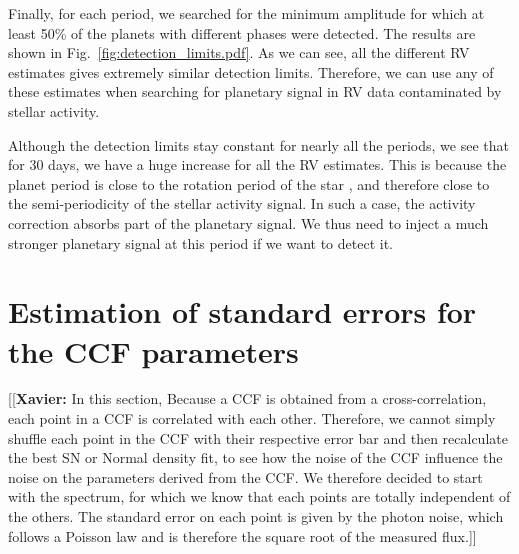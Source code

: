 \documentclass{aa}
\newcommand{\xavier}[1]{{\color{blue}[[\textbf{Xavier: }#1]]}}
\begin{document}
{Finally, for each period, we searched for the minimum amplitude for which at least 50\% of the planets with different phases were detected. The results are shown in Fig.~\ref{fig:detection_limits.pdf}. As we can see, all the different RV estimates gives extremely similar detection limits. Therefore, we can use any of these estimates when searching for planetary signal in RV data contaminated by stellar activity.

Although the detection limits stay constant for nearly all the periods, we see that for 30 days, we have a huge increase for all the RV estimates. This is because the planet period is close to the rotation period of the star \citep[36.7 days,][]{Dumusque-2012}, and therefore close to the semi-periodicity of the stellar activity signal. In such a case, the activity correction absorbs part of the planetary signal. We thus need to inject a much stronger planetary signal at this period if we want to detect it.}


\section{Estimation of standard errors for the CCF parameters} \label{sec:5}

\xavier{In this section, Because a CCF is obtained from a cross-correlation, each point in a CCF is correlated with each other. Therefore, we cannot simply shuffle each point in the CCF with their respective error bar and then recalculate the best SN or Normal density fit, to see how the noise of the CCF influence the noise on the parameters derived from the CCF. We therefore decided to start with the spectrum, for which we know that each points are totally independent of the others. The standard error on each point is given by the photon noise, which follows a Poisson law and is therefore the square root of the measured flux.}
\end{document}
